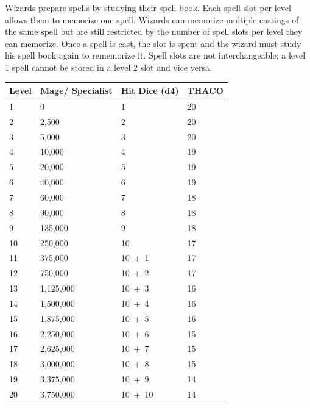 \begin{multicols}{2}
Wizards prepare spells by studying their spell book.  Each spell slot per level allows them to memorize one spell.  Wizards can memorize multiple castings of the same spell but are still restricted by the number of spell slots per level they can memorize.  Once a spell is cast, the slot is spent and the wizard must study his spell book again to rememorize it.  Spell slots are not interchangeable; a level 1 spell cannot be stored in a level 2 slot and vice versa.

\noindent
\begin{minipage}{\columnwidth}

\label{wizardadvancement}
\noindent
\begin{tabular}{|m{}|m{}|m{}|m{}|}
\hline
Level	& Mage/ Specialist	& Hit Dice (d4)	& THACO \\
\hline\hline
\rowcolor[gray]{.9}1	& 0				& 1		& 20 \\
2	& 2,500			& 2		& 20 \\
\rowcolor[gray]{.9}3	& 5,000			& 3		& 20 \\
4	& 10,000		& 4		& 19 \\
\rowcolor[gray]{.9}5	& 20,000		& 5		& 19 \\
6	& 40,000		& 6		& 19 \\
\rowcolor[gray]{.9}7	& 60,000		& 7		& 18 \\
8	& 90,000		& 8		& 18 \\
\rowcolor[gray]{.9}9	& 135,000		& 9		& 18 \\
10	& 250,000		& 10	& 17 \\
\rowcolor[gray]{.9}11	& 375,000		& 10~+~1	& 17 \\
12	& 750,000		& 10~+~2	& 17 \\
\rowcolor[gray]{.9}13	& 1,125,000		& 10~+~3	& 16 \\
14	& 1,500,000		& 10~+~4	& 16 \\
\rowcolor[gray]{.9}15	& 1,875,000		& 10~+~5	& 16 \\
16	& 2,250,000		& 10~+~6	& 15 \\
\rowcolor[gray]{.9}17	& 2,625,000		& 10~+~7	& 15 \\
18	& 3,000,000		& 10~+~8	& 15 \\
\rowcolor[gray]{.9}19	& 3,375,000		& 10~+~9	& 14 \\
20	& 3,750,000		& 10~+~10	& 14 \\
\hline
\end{tabular}

\end{minipage}

\end{multicols}

